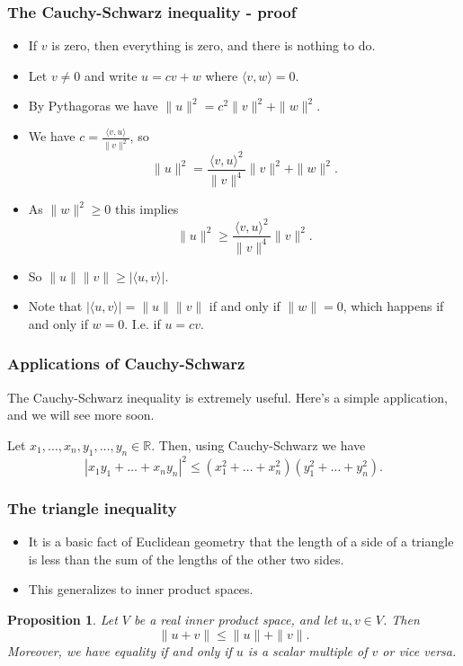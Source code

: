 \documentclass[handout]{beamer}
\newtheorem{proposition}[theorem]{Proposition}
\newcommand{\bR}{\mathbb{R}}
\begin{document}
\begin{frame}
\frametitle{The Cauchy-Schwarz inequality - proof}
\begin{itemize}
\item If $v$ is zero, then everything is zero, and there is nothing to do. 
\item Let $v\neq 0$ and write $u = cv + w$ where $\langle v, w \rangle = 0$. 
\item By Pythagoras we have $\|u\|^2 = c^2\|v\|^2 +\|w\|^2$.
\item We have $c = \frac{\langle v, u \rangle}{\|v\|^2}$, so 
\[\|u\|^2 =\frac{\langle v, u \rangle^2}{\|v\|^4}\|v\|^2 + \|w\|^2.\]
\item As $\|w\|^2\geq 0$ this implies 
\[\|u\|^2 \geq \frac{\langle v, u \rangle^2}{\|v\|^4}\|v\|^2.\]
\item So $\|u\|\|v\| \geq |\langle u, v\rangle|.$  

\item Note that $|\langle u, v\rangle| =\|u\|\|v\|$ if and only if $\|w\| = 0$, which happens if and only if $w = 0$. I.e. if $u=cv$.
\end{itemize}
\end{frame}

\begin{frame}
\frametitle{Applications of Cauchy-Schwarz}
The Cauchy-Schwarz inequality is extremely useful. Here's a simple application, and we will see more soon.\vspace{0.5cm}
\begin{example}
Let $x_1,\ldots,x_n,y_1,\ldots,y_n \in\bR$. Then, using Cauchy-Schwarz we have
\[|x_1y_1+\ldots +x_ny_n|^2\leq (x_1^2+\ldots + x_n^2)(y_1^2+\ldots +y_n^2).\]
\end{example}
\end{frame}

\begin{frame}
\frametitle{The triangle inequality}
\begin{itemize}
\item It is a basic fact of Euclidean geometry that the length of a side of a triangle is less than the sum of the lengths of the other two sides. 
\item This generalizes to inner product spaces.
\end{itemize}

\begin{proposition}\label{P:LA4tri}
Let $V$ be a real inner product space, and let $u,v\in V$. Then 
\[\|u + v \|\leq \|u\|+\|v\|.\]
Moreover, we have equality if and only if $u$ is a scalar multiple of $v$ or vice versa.
\end{proposition} 
\end{frame}
\end{document}
